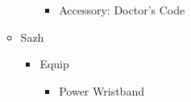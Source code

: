 \begin{menu}
\begin{multicols}{2}
\begin{itemize}
\begin{itemize}
\begin{itemize}
\begin{itemize}
                \item Accessory: Doctor's Code
            \end{itemize}
        \end{itemize}
        \item Sazh
        \begin{itemize}
            \item Equip
            \begin{itemize}
                \item Power Wristband
            \end{itemize}
        \end{itemize}
    \end{itemize}
\end{itemize}
\end{multicols} 
\end{menu}

